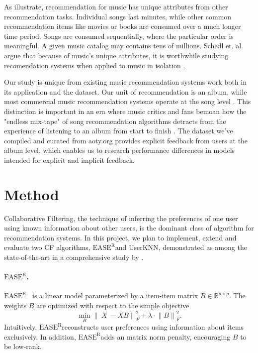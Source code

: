 \documentclass{article}
\DeclareMathOperator{\X}{\mathit{X}}
\newcommand{\easer}{$\text{EASE}^\text{R}$}
\newcommand{\userknn}{UserKNN\xspace}
\newcommand{\norm}[1]{\ensuremath{\lVert #1 \rVert}}
\begin{document}
As \citet{Schedl2018} illustrate, recommendation for music has unique attributes from other
recommendation tasks. Individual songs last minutes, while other common recommendation items
like movies or books are consumed over a much longer time period. Songs are consumed sequentially, 
where the particular order is meaningful. A given music catalog may contains tens of millions. 
Schedl et. al. argue that because of music's unique attributes, it is worthwhile 
studying recomendation systems when applied to music
 in isolation \citep{Schedl2018}. 

Our study is unique from existing music recommendation systems work 
 both in its application and the dataset. Our unit of recommendation is an album, while
 most commercial music recommendation systems operate at the song level \citep{Schedl2018}. 
 This distinction is important in an era where music critics and fans bemoan how the "endless mix-tape" of song recommendation
algorithms detracts from the experience of listening to an album from start to finish \citep{thoth2018, hilton2013}. 
The dataset we've compiled and curated from aoty.org provides explicit feedback from 
users at the album level, which enables us to research performance differences in models
intended for explicit and implicit feedback. 


\section{Method}
Collaborative Filtering, the technique of inferring the preferences of one user
 using known information about other users, is the dominant class of algorithm
 for recommendation systems.
In this project, we plan to implement, extend and evaluate two CF algorithms,
 \easer and \userknn, demonstrated as among the state-of-the-art in a
 comprehensive study by \citet{anelliTopNRecommendationAlgorithms2022}.

\paragraph*{\easer.}
\easer~\citep{steckEmbarrassinglyShallowAutoencoders2019}
is a linear model parameterized by a item-item matrix $B \in
	\mathbb{R}^{p \times p}$.
The weights $B$ are optimized with respect to the simple objective
 \begin{equation} \min_B \norm{\X - X B}_F^2 + \lambda \cdot \norm{B}_F^2
 \text{.
}
\end{equation}
Intuitively, \easer reconstructs user preferences using information about items
 exclusively.
In addition, \easer adds an matrix norm penalty, encouraging $B$ to be
 low-rank.
\end{document}
